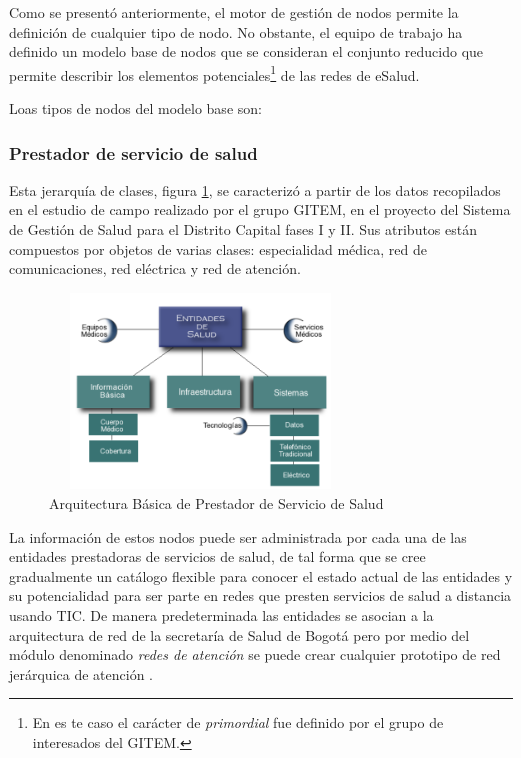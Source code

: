 Como se presentó anteriormente, el motor de gestión de nodos permite la definición de cualquier tipo de nodo. No obstante, el equipo de trabajo ha definido un modelo base de nodos que se consideran el conjunto reducido que permite describir los elementos potenciales\footnote{En es te caso el carácter de \textit{primordial} fue definido por el grupo de interesados del GITEM.} de las redes de eSalud.

Loas tipos de nodos del modelo base son:

\subsubsection{Prestador de servicio de salud} 
Esta jerarquía de clases, figura \ref{entidades}, se caracterizó a partir de los datos recopilados en el estudio de campo realizado por el grupo GITEM, en el proyecto del Sistema de Gestión de Salud para el Distrito Capital fases I y II. Sus atributos están compuestos por objetos de varias clases: especialidad médica, red de comunicaciones, red eléctrica y red de atención.

\begin{figure}
 \centering
 \includegraphics[width=80mm, height=52mm]{entidades.png}
 \caption{Arquitectura Básica de Prestador de Servicio de Salud}
\label{entidades}
\end{figure}

La información de estos nodos puede ser administrada por cada una de las entidades prestadoras de servicios de salud, de tal forma que se cree gradualmente un catálogo flexible para conocer el estado actual de las entidades y su potencialidad para ser parte en redes que presten servicios de salud a distancia usando TIC. De manera predeterminada las entidades se asocian a la arquitectura de red de la secretaría de Salud de Bogotá pero por medio del módulo denominado \textit{redes de atención} se puede crear cualquier prototipo de red jerárquica de atención \cite{yellowlees}.

